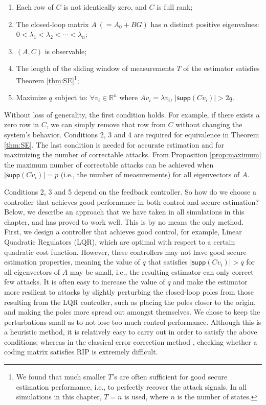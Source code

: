 \documentclass[../../thesis.tex]{subfiles}
\begin{document}
\begin{enumerate}
	\item Each row of $C$ is not identically zero, and $C$ is full rank;
	\item The closed-loop matrix $A~(=A_0+BG)$ has $n$ distinct positive eigenvalues: $0< \lambda_1 < \lambda_2 < \cdots < \lambda _n$;
	\item $(A,C)$ is observable;
	\item The length of the sliding window of measurements $T$ of the estimator satisfies Theorem \ref{thm:SE}\footnote{We found that much smaller $T$'s are often sufficient for good secure estimation performance, i.e., to perfectly recover the attack signals. In all simulations in this chapter, $T=n$ is used, where $n$ is the number of states.};
	\item Maximize $q$ subject to: $\forall v_i \in \mathbb{R}^n$ where $Av_i = \lambda v_i$, $\lvert \textsf{supp} (C v_i)  \rvert > 2q$.
\end{enumerate}
Without loss of generality, the first condition holds. For example, if there exists a zero row in $C$, we can simply remove that row from $C$ without changing the system's behavior. Conditions 2, 3 and 4 are required for equivalence in Theorem \ref{thm:SE}. The last condition is needed for accurate estimation and for maximizing the number of correctable attacks. From Proposition \ref{prop:maximum} the maximum number of correctable attacks can be achieved when $\lvert \textsf{supp} (C v_i)  \rvert = p$ (i.e., the number of measurements) for all eigenvectors of $A$. 

Conditions 2, 3 and 5 depend on the feedback controller. So how do we choose a controller that achieves good performance in both control and secure estimation? Below, we describe an approach that we have taken in all simulations in this chapter, and has proved to work well. This is by no means the only method. First, we design a controller that achieves good control, for example, Linear Quadratic Regulators (LQR), which are optimal with respect to a certain quadratic cost function. However, these controllers may not have good secure estimation properties, meaning the value of $q$ that satisfies $\lvert \textsf{supp} (C v_i) \rvert > q$ for all eigenvectors of $A$ may be small, i.e., the resulting estimator can only correct few attacks. It is often easy to increase the value of $q$ and make the estimator more resilient to attacks by slightly perturbing the closed-loop poles from those resulting from the LQR controller, such as placing the poles closer to the origin, and making the poles more spread out amongst themselves. We chose to keep the perturbations small as to not lose too much control performance.  
Although this is a heuristic method, it is relatively easy to carry out in order to satisfy the above conditions; whereas in the classical error correction method \cite{tao11}, checking whether a coding matrix satisfies RIP is extremely difficult.
\end{document}
